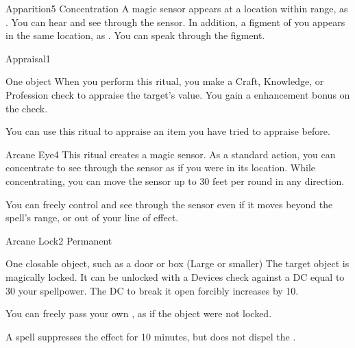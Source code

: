 \begin{spellsection}{Apparition}{5}
\spellrng{\rngext \rngunrestricted}
\spelldur Concentration
\spellline
\spelleffect A magic sensor appears at a location within range, as . You can hear and see through the sensor. In addition, a figment of you appears in the same location, as . You can speak through the figment.
\spellnotes \sensorspellnotes
\end{spellsection}

\begin{spellsection}{Appraisal}{1}
\spellrng{\rngtouch}
\begin{spelltarget}{One object}
    \spelleffect When you perform this ritual, you make a Craft, Knowledge, or Profession check to appraise the target's value. You gain a  enhancement bonus on the check.
\end{spelltarget}
\spellnotes You can use this ritual to appraise an item you have tried to appraise before.
\end{spellsection}

\begin{spellsection}{Arcane Eye}{4}
\spellrng{\rngmed}
\spelldur \durlong \dismissable
{}
\spellline
\spelleffect This ritual creates a magic sensor. As a standard action, you can concentrate to see through the sensor as if you were in its location. While concentrating, you can move the sensor up to 30 feet per round in any direction.

You can freely control and see through the sensor even if it moves beyond the spell's range, or out of your line of effect.
\spellnotes {}
\end{spellsection}

\begin{spellsection}{Arcane Lock}{2}
\spelldur Permanent
\begin{spelltarget}{One closable object, such as a door or box (Large or smaller)}
    \spelleffect The target object is magically locked. It can be unlocked with a Devices check against a DC equal to 30 \add your spellpower. The DC to break it open forcibly increases by 10.

    You can freely pass your own , as if the object were not locked.
\end{spelltarget}
\spellnotes A  spell suppresses the effect for 10 minutes, but does not dispel the .
\end{spellsection}

